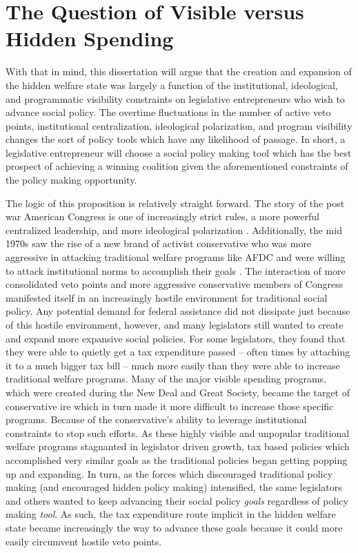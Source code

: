 \documentclass[12pt]{article}
\begin{document}
\section{The Question of Visible versus Hidden Spending}
With that in mind, this dissertation will argue that the creation and expansion of the hidden welfare state was largely a function of the institutional, ideological, and programmatic visibility constraints on legislative entrepreneurs who wish to advance social policy. The overtime fluctuations in the number of active veto points, institutional centralization, ideological polarization, and program visibility changes the sort of policy tools which have any likelihood of passage. In short, a legislative entrepreneur will choose a social policy making tool which has the best prospect of achieving a winning coalition given the aforementioned constraints of the policy making opportunity.

The logic of this proposition is relatively straight forward. The story of the post war American Congress is one of increasingly strict rules, a more powerful centralized leadership, and more ideological polarization \citep{rohde1991, binder2003}. Additionally, the mid 1970s saw the rise of a new brand of activist conservative who was more aggressive in attacking traditional welfare programs like AFDC and were willing to attack institutional norms to accomplish their goals \citep{hacker2007, theriault2013}. The interaction of more consolidated veto points and more aggressive conservative members of Congress manifested itself in an increasingly hostile environment for traditional social policy. Any potential demand for federal assistance did not dissipate just because of this hostile environment, however, and many legislators still wanted to create and expand more expansive social policies. For some legislators, they found that they were able to quietly get a tax expenditure passed -- often times by attaching it to a much bigger tax bill -- much more easily than they were able to increase traditional welfare programs. Many of the major visible spending programs, which were created during the New Deal and Great Society, became the target of conservative ire which in turn made it more difficult to increase those specific programs. Because of the conservative's ability to leverage institutional constraints to stop such efforts. As these highly visible and unpopular traditional welfare programs stagnanted in legislator driven growth, tax based policies which accomplished very similar goals as the traditional policies began getting popping up and expanding. In turn, as the forces which discouraged traditional policy making (and encouraged hidden policy making) intensified, the same legislators and others wanted to keep advancing their social policy \emph{goals} regardless of policy making \emph{tool}. As such, the tax expenditure route implicit in the hidden welfare state became increasingly the way to advance these goals because it could more easily circumvent hostile veto points.
\end{document}
